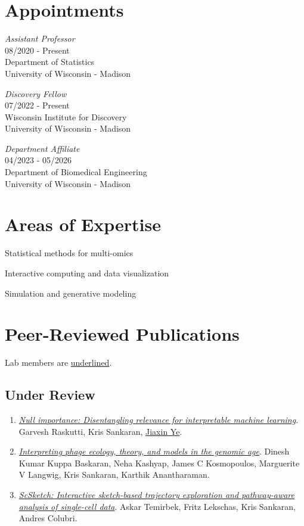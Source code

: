 \documentclass[letterpaper]{article}
\renewenvironment{itemize}{
  \begin{list}{}{
    \setlength{\leftmargin}{1.5em}
  }
}{
  \end{list}
}
\begin{document}
\section*{Appointments}
\begin{itemize}
\item \textit{Assistant Professor}\\
08/2020 - Present \\
Department of Statistics \\
University of Wisconsin - Madison

\item \textit{Discovery Fellow} \\
07/2022 - Present \\
Wisconsin Institute for Discovery \\
University of Wisconsin - Madison

\item \textit{Department Affiliate}\\
04/2023 - 05/2026 \\
Department of Biomedical Engineering \\
University of Wisconsin - Madison
\end{itemize}

\section*{Areas of Expertise}
\begin{itemize}
  \item Statistical methods for multi-omics
  \item Interactive computing and data visualization
  \item Simulation and generative modeling
\end{itemize}

\section*{Peer-Reviewed Publications}
Lab members are \underline{underlined}.

\subsection*{Under Review}
\begin{enumerate}
  \item \href{https://arxiv.org/abs/2609.19511}{\textit{Null importance: Disentangling relevance for interpretable machine learning}}. Garvesh Raskutti, Kris Sankaran, \underline{Jiaxin Ye}.
  \item \href{https://doi.org/10.32942/x2p07g}{\textit{Interpreting phage ecology, theory, and models in the genomic age}}. Dinesh Kumar Kuppa Baskaran,  Neha Kashyap, James C Kosmopoulos, Marguerite V Langwig, Kris Sankaran, Karthik Anantharaman.
  \item \href{https://doi.org/10.64898/2026.04.16.718997}{\textit{ScSketch: Interactive sketch-based trajectory exploration and pathway-aware analysis of single-cell data}}. Askar Temirbek, Fritz Lekschas, Kris Sankaran, Andres Colubri.
\end{enumerate}
\end{document}
